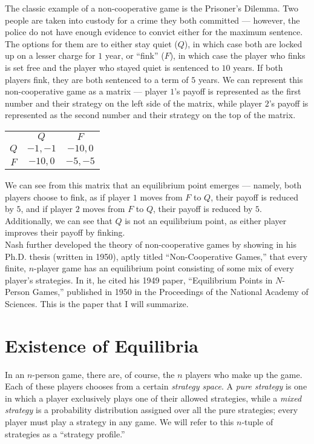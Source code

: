 \documentclass[12pt]{extarticle}
\begin{document}
  The classic example of a non-cooperative game is the Prisoner's Dilemma. Two people are taken into custody for a crime they both committed --- however, the police do not have enough evidence to convict either for the maximum sentence. The options for them are to either stay quiet ($Q$), in which case both are locked up on a lesser charge for $1$ year, or ``fink'' ($F$), in which case the player who finks is set free and the player who stayed quiet is sentenced to $10$ years. If both players fink, they are both sentenced to a term of $5$ years. We can represent this non-cooperative game as a matrix --- player $1$'s payoff is represented as the first number and their strategy on the left side of the matrix, while player $2$'s payoff is represented as the second number and their strategy on the top of the matrix.
  \begin{center}
    \begin{tabular}{c|c|c|}
      \multicolumn{1}{c}{} & \multicolumn{1}{c}{$Q$} & \multicolumn{1}{c}{$F$}\\
      \cline{2-3}
      $Q$ & $-1,-1$ & $-10,0$\\
      \cline{2-3}
      $F$ & $-10,0$ & $-5,-5$\\
      \cline{2-3}
    \end{tabular}
  \end{center}
  We can see from this matrix that an equilibrium point emerges --- namely, both players choose to fink, as if player $1$ moves from $F$ to $Q$, their payoff is reduced by $5$, and if player $2$ moves from $F$ to $Q$, their payoff is reduced by $5$. Additionally, we can see that $Q$ is not an equilibrium point, as either player improves their payoff by finking.\\

  Nash further developed the theory of non-cooperative games by showing in his Ph.D. thesis (written in 1950), aptly titled ``Non-Cooperative Games,'' that every finite, $n$-player game has an equilibrium point consisting of some mix of every player's strategies. In it, he cited his 1949 paper, ``Equilibrium Points in $N$-Person Games,'' published in 1950 in the Proceedings of the National Academy of Sciences. This is the paper that I will summarize.
  \section*{Existence of Equilibria}%
  In an $n$-person game, there are, of course, the $n$ players who make up the game. Each of these players chooses from a certain \textit{strategy space}. A \textit{pure strategy} is one in which a player exclusively plays one of their allowed strategies, while a \textit{mixed strategy} is a probability distribution assigned over all the pure strategies; every player must play a strategy in any game. We will refer to this $n$-tuple of strategies as a ``strategy profile.''\\
\end{document}
